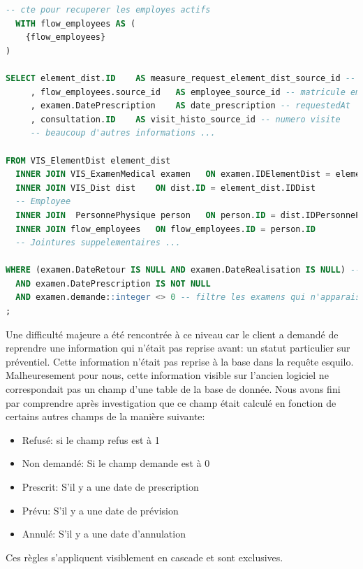 \begin{lstlisting}[language=SQL, caption=Aperçu de la requête]
  -- cte pour recuperer les employes actifs
  WITH flow_employees AS (
	{flow_employees}
)

SELECT element_dist.ID    AS measure_request_element_dist_source_id -- matricule examen
     , flow_employees.source_id   AS employee_source_id -- matricule employe
     , examen.DatePrescription    AS date_prescription -- requestedAt
     , consultation.ID    AS visit_histo_source_id -- numero visite
     -- beaucoup d'autres informations ...

FROM VIS_ElementDist element_dist
  INNER JOIN VIS_ExamenMedical examen   ON examen.IDElementDist = element_dist.ID
  INNER JOIN VIS_Dist dist    ON dist.ID = element_dist.IDDist
  -- Employee
  INNER JOIN  PersonnePhysique person   ON person.ID = dist.IDPersonnePhysique
  INNER JOIN flow_employees   ON flow_employees.ID = person.ID
  -- Jointures suppelementaires ... 

WHERE (examen.DateRetour IS NULL AND examen.DateRealisation IS NULL) -- i.e. en attente de resultat
  AND examen.DatePrescription IS NOT NULL
  AND examen.demande::integer <> 0 -- filtre les examens qui n'apparaissent a aucun endroit dans le front
;
\end{lstlisting}

Une difficulté majeure a été rencontrée à ce niveau car le client a demandé de reprendre une information qui n'était pas reprise avant: un statut particulier sur préventiel.
Cette information n'était pas reprise à la base dans la requête esquilo. Malheuresement pour nous, cette information visible sur l'ancien logiciel ne correspondait pas un champ d'une table de la base de donnée. Nous avons fini par comprendre après investigation que ce champ était calculé en fonction de certains autres champs de la manière suivante:

\begin{itemize}
  \item Refusé: si le champ refus est à 1
  \item Non demandé: Si le champ demande est à 0
  \item Prescrit: S'il y a une date de prescription
  \item Prévu: S'il y a une date de prévision
  \item Annulé: S'il y a une date d'annulation
\end{itemize}

Ces règles s'appliquent visiblement en cascade et sont exclusives.

